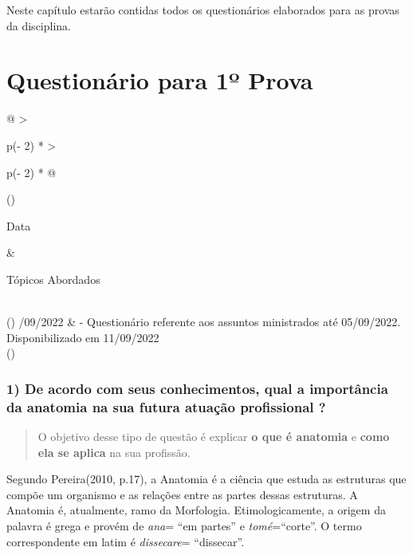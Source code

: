 \documentclass[
]{book}
\begin{document}
Neste capítulo estarão contidas todos os questionários elaborados para as provas da disciplina.

\hypertarget{questionuxe1rio-para-1uxba-prova}{%
\section{Questionário para 1º Prova}\label{questionuxe1rio-para-1uxba-prova}}

\begin{longtable}[]{@{}
  >{\raggedright\arraybackslash}p{(\columnwidth - 2\tabcolsep) * }
  >{\raggedright\arraybackslash}p{(\columnwidth - 2\tabcolsep) * }@{}}
\toprule()
\begin{minipage}[b]{\linewidth}\raggedright
Data
\end{minipage} & \begin{minipage}[b]{\linewidth}\raggedright
Tópicos Abordados
\end{minipage} \\
\midrule()
/09/2022 & - Questionário referente aos assuntos ministrados até 05/09/2022. Disponibilizado em 11/09/2022 \\
\bottomrule()
\end{longtable}

\hypertarget{de-acordo-com-seus-conhecimentos-qual-a-importuxe2ncia-da-anatomia-na-sua-futura-atuauxe7uxe3o-profissional}{%
\subsubsection*{1) De acordo com seus conhecimentos, qual a importância da anatomia na sua futura atuação profissional ?}\label{de-acordo-com-seus-conhecimentos-qual-a-importuxe2ncia-da-anatomia-na-sua-futura-atuauxe7uxe3o-profissional}}

\begin{quote}
O objetivo desse tipo de questão é explicar \textbf{o que é anatomia} e \textbf{como ela se aplica} na sua profissão.
\end{quote}

Segundo Pereira(2010, p.17), a Anatomia é a ciência que estuda as estruturas que compõe um organismo e as relações entre as partes dessas estruturas. A Anatomia é, atualmente, ramo da Morfologia. Etimologicamente, a origem da palavra é grega e provém de \emph{ana}= ``em partes'' e \emph{tomé}=``corte''. O termo correspondente em latim é \emph{dissecare}= ``dissecar''.
\end{document}
